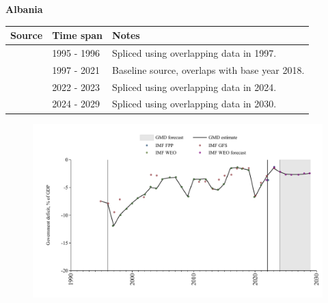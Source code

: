 \documentclass[12pt,a4paper,landscape]{article}
\begin{document}
\begin{adjustbox}{max totalsize={\paperwidth}{\paperheight},center}
\begin{minipage}[t][\textheight][t]{\textwidth}
\vspace*{0.5cm}
{}
\begin{center}
{\Large\bfseries Albania}
\end{center}
\vspace{0.5cm}
\begin{table}[H]
\centering
\small
\begin{tabular}{|l|l|l|}
\hline
\textbf{Source} & \textbf{Time span} & \textbf{Notes} \\
\hline
\rowcolor{white}\cite{IMF_GFS}& 1995 - 1996 &Spliced using overlapping data in 1997.\\
\rowcolor{lightgray}\cite{IMF_WEO}& 1997 - 2021 &Baseline source, overlaps with base year 2018.\\
\rowcolor{white}\cite{IMF_GFS}& 2022 - 2023 &Spliced using overlapping data in 2024.\\
\rowcolor{lightgray}\cite{IMF_WEO_forecast}& 2024 - 2029 &Spliced using overlapping data in 2030.\\
\hline
\end{tabular}
\end{table}
\begin{figure}[H]
\centering
\includegraphics[width=\textwidth,height=0.6\textheight,keepaspectratio]{graphs/ALB_govdef_GDP.pdf}
\end{figure}
\end{minipage}
\end{adjustbox}
\end{document}
